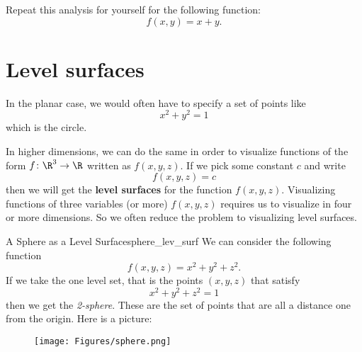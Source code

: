         \begin{exercise}[Plane]
        Repeat this analysis for yourself for the following function:
        \[
        f(x,y)=x+y.
        \]
        \end{exercise}
        
        \section{Level surfaces}
        In the planar case, we would often have to specify a set of points like
        \[
        x^2+y^2=1
        \]
        which is the circle.  
        
        In higher dimensions, we can do the same in order to visualize functions of the form $f\colon \R^3\to \R$ written as $f(x,y,z)$.  If we pick some constant $c$ and write
        \[
        f(x,y,z)=c
        \]
        then we will get the \textbf{level surfaces} for the function $f(x,y,z)$.  Visualizing functions of three variables (or more) $f(x,y,z)$ requires us to visualize in four or more dimensions. So we often reduce the problem to visualizing level surfaces.
        
        \begin{ex}{A Sphere as a Level Surface}{sphere_lev_surf}
        We can consider the following function
        \[
        f(x,y,z)=x^2+y^2+z^2.
        \]
        If we take the one level set, that is the points $(x,y,z)$ that satisfy
        \[
        x^2+y^2+z^2=1
        \]
        then we get the \emph{2-sphere}.  These are the set of points that are all a distance one from the origin.  Here is a picture:
        \begin{figure}[H]
            \centering
            \texttt{[image: Figures/sphere.png]}
        \end{figure}
        \end{ex}
        
